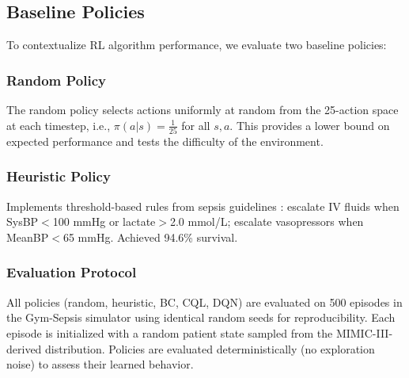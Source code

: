\subsection{Baseline Policies}\label{sec:methods:baselines}

To contextualize RL algorithm performance, we evaluate two baseline policies:

\subsubsection{Random Policy}

The random policy selects actions uniformly at random from the 25-action space at each timestep, i.e., $\pi(a|s) = \frac{1}{25}$ for all $s, a$. This provides a lower bound on expected performance and tests the difficulty of the environment.

\subsubsection{Heuristic Policy}

Implements threshold-based rules from sepsis guidelines \citep{rhodes2017ssc}: escalate IV fluids when SysBP$<$100 mmHg or lactate$>$2.0 mmol/L; escalate vasopressors when MeanBP$<$65 mmHg. Achieved 94.6\% survival.

\subsubsection{Evaluation Protocol}

All policies (random, heuristic, BC, CQL, DQN) are evaluated on 500 episodes in the Gym-Sepsis simulator using identical random seeds for reproducibility. Each episode is initialized with a random patient state sampled from the MIMIC-III-derived distribution. Policies are evaluated deterministically (no exploration noise) to assess their learned behavior.


